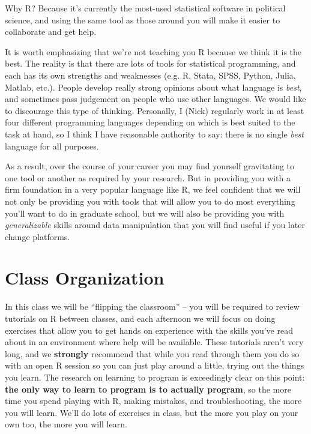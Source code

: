 \documentclass[12pt]{article}
\begin{document}
Why R? Because it's currently the most-used statistical software in political science, and using the same tool as those around you will make it easier to collaborate and get help.

It is worth emphasizing that we're not teaching you R because we think it is the best. The reality is that there are lots of tools for statistical programming, and each has its own strengths and weaknesses (e.g. R, Stata, SPSS, Python, Julia, Matlab, etc.). People develop really strong opinions about what language is \emph{best}, and sometimes pass judgement on people who use other languages. We would like to discourage this type of thinking. Personally, I (Nick) regularly work in at least four different programming languages depending on which is best suited to the task at hand, so I think I have reasonable authority to say: there is no single \emph{best} language for all purposes.

As a result, over the course of your career you may find yourself gravitating to one tool or another as required by your research. But in providing you with a firm foundation in a very popular language like R, we feel confident that we will not only be providing you with tools that will allow you to do most everything you'll want to do in graduate school, but we will also be providing you with \emph{generalizable} skills around data manipulation that you will find useful if you later change platforms.

\section{Class Organization}

In this class we will be ``flipping the classroom'' -- you will be required to review tutorials on R between classes, and each afternoon we will focus on doing exercises that allow you to get hands on experience with the skills you've read about in an environment where help will be available. These tutorials aren't very long, and we \textbf{strongly} recommend that while you read through them you do so with an open R session so you can just play around a little, trying out the things you learn. The research on learning to program is exceedingly clear on this point: \textbf{the only way to learn to program is to actually program}, so the more time you spend playing with R, making mistakes, and troubleshooting, the more you will learn. We'll do lots of exercises in class, but the more you play on your own too, the more you will learn.
\end{document}
